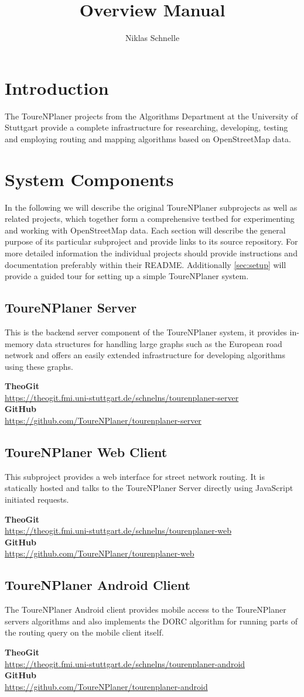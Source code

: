 \documentclass[titlepage,parskip=true]{scrartcl}
\title{Overview Manual}
\author{Niklas Schnelle}
\newcommand{\repobox}[2]{
	\begin{shaded}
		\textbf{TheoGit}\\\hspace{5mm}\url{#1}\\
		\textbf{GitHub}\\\hspace{5mm}\url{#2}
	\end{shaded}
}
\begin{document}
\maketitle

\tableofcontents

\pagebreak

\section{Introduction}
The ToureNPlaner projects from the Algorithms Department at the
University of Stuttgart provide a complete infrastructure for researching, developing,
testing and employing routing and mapping algorithms based on OpenStreetMap data.
\section{System Components}
In the following we will describe the original ToureNPlaner subprojects as well
as related projects, which together form a comprehensive testbed for
experimenting and working with OpenStreetMap data.  Each section will describe
the general purpose of its particular subproject and provide links to its source
repository. For more detailed information
the individual projects should provide instructions and documentation
preferably within their README. Additionally \autoref{sec:setup} will provide
a guided tour for setting up a simple ToureNPlaner system.

\subsection{ToureNPlaner Server}
This is the backend server component of the ToureNPlaner system, it provides
in-memory data structures for handling large graphs such as the European road
network and offers an easily extended infrastructure for developing algorithms
using these graphs.
\repobox{https://theogit.fmi.uni-stuttgart.de/schnelns/tourenplaner-server}{https://github.com/ToureNPlaner/tourenplaner-server}
\subsection{ToureNPlaner Web Client}
This subproject provides a web interface for street network routing. It is
statically hosted and talks to the ToureNPlaner Server directly using
JavaScript initiated requests.
\repobox{https://theogit.fmi.uni-stuttgart.de/schnelns/tourenplaner-web}{https://github.com/ToureNPlaner/tourenplaner-web}
\subsection{ToureNPlaner Android Client}
The ToureNPlaner Android client provides mobile access to the ToureNPlaner
servers algorithms and also implements the DORC algorithm for running parts of
the routing query on the mobile client itself.
\repobox{https://theogit.fmi.uni-stuttgart.de/schnelns/tourenplaner-android}{https://github.com/ToureNPlaner/tourenplaner-android}
\end{document}
